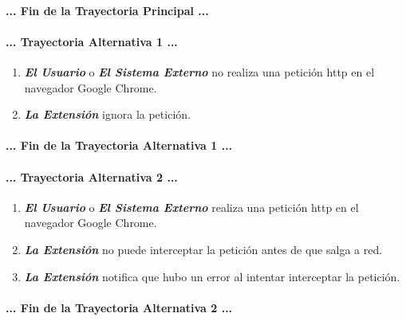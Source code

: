 \documentclass[12pt, a4paper, titlepage]{article}
\begin{document}
				\paragraph{... Fin de la Trayectoria Principal ...}
				
				\paragraph{... Trayectoria Alternativa 1 ...}
				\begin{enumerate}
					\item \textbf{\textit{El Usuario}} o \textbf{\textit{El Sistema Externo}} no realiza una petición \acrshort{http} en el navegador Google Chrome.\\
					\item \textbf{\textit{La Extensión}} ignora la petición.					
				\end{enumerate}
				\paragraph{... Fin de la Trayectoria Alternativa 1 ...}
				
				\paragraph{... Trayectoria Alternativa 2 ...}
				\begin{enumerate}
					\item \textbf{\textit{El Usuario}} o \textbf{\textit{El Sistema Externo}} realiza una petición \acrshort{http} en el navegador Google Chrome.\\
					\item \textbf{\textit{La Extensión}} no puede interceptar la petición antes de que salga a red.\\
					\item \textbf{\textit{La Extensión}} notifica que hubo un error al intentar interceptar la petición. 
				\end{enumerate}
				\paragraph{... Fin de la Trayectoria Alternativa 2 ...}
				
\end{document}
